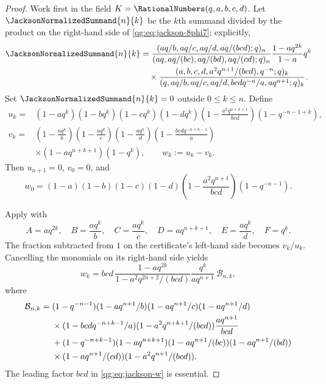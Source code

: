 \begin{proof}
Work first in the field $K=\RationalNumbers(q,a,b,c,d)$.  Let
$\JacksonNormalizedSummand{n}{k}$ be the
$k$th summand divided by the product on the right-hand side of
\eqref{qg:eq:jackson-8phi7}; explicitly,
\begin{align*}
\JacksonNormalizedSummand{n}{k}&=
 \frac{(aq/b,aq/c,aq/d,aq/(bcd);q)_n}
 {(aq,aq/(bc),aq/(bd),aq/(cd);q)_n}
 \frac{1-aq^{2k}}{1-a}q^k\\
&\quad\times
 \frac{(a,b,c,d,a^2q^{n+1}/(bcd),q^{-n};q)_k}
 {(q,aq/b,aq/c,aq/d,bcdq^{-n}/a,aq^{n+1};q)_k}.
\end{align*}
Set $\JacksonNormalizedSummand{n}{k}=0$ outside $0\le k\le n$.  Define
\begin{align*}
u_k={}&(1-aq^k)(1-bq^k)(1-cq^k)(1-dq^k)
 \left(1-\frac{a^2q^{n+k+1}}{bcd}\right)
 (1-q^{-n-1+k}),\\
v_k={}&\left(1-\frac{aq^k}{b}\right)
 \left(1-\frac{aq^k}{c}\right)
 \left(1-\frac{aq^k}{d}\right)
 \left(1-\frac{bcdq^{-n+k-1}}a\right)\\
&\times(1-aq^{n+k+1})(1-q^k),
\qquad
w_k:=u_k-v_k.
\end{align*}
Then $u_{n+1}=0$, $v_0=0$, and
\begin{equation}
\label{qg:eq:jackson-w0}
w_0=(1-a)(1-b)(1-c)(1-d)
 \left(1-\frac{a^2q^{n+1}}{bcd}\right)(1-q^{-n-1}).
\end{equation}

Apply  with
\begin{equation}
\label{qg:eq:jackson-certificate-substitution}
A=aq^{2k},\quad B=\frac{aq^k}{b},\quad
C=\frac{aq^k}{c},\quad D=aq^{n+k+1},\quad
E=\frac{aq^k}{d},\quad F=q^k.
\end{equation}
The fraction subtracted from $1$ on the certificate's left-hand side becomes
$v_k/u_k$.  Cancelling the monomials on its right-hand side yields
\begin{equation}
\label{qg:eq:jackson-w}
w_k=bcd\,
 \frac{1-aq^{2k}}{1-a^2q^{2n+2}/(bcd)}
 \frac{q^k}{aq^{n+1}}\,\mathcal B_{n,k},
\end{equation}
where
\begin{align}
\mathcal B_{n,k}={}&
 (1-q^{-n-1})(1-aq^{n+1}/b)(1-aq^{n+1}/c)(1-aq^{n+1}/d)
 \notag\\
&\times(1-bcdq^{-n+k-1}/a)(1-a^2q^{n+k+1}/(bcd))
 \frac{aq^{n+1}}{bcd}
 \notag\\
&+(1-q^{-n+k-1})(1-aq^{n+k+1})
 (1-aq^{n+1}/(bc))(1-aq^{n+1}/(bd))
 \notag\\
&\times(1-aq^{n+1}/(cd))(1-a^2q^{n+1}/(bcd)).
\label{qg:eq:jackson-B}
\end{align}
The leading factor $bcd$ in \eqref{qg:eq:jackson-w} is essential.


\end{proof}
